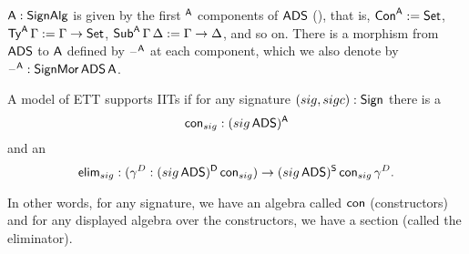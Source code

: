 \documentclass[a4paper,UKenglish,cleveref, autoref]{lipics-v2019}
\begin{document}
\begin{definition}\label{def:a}
  $\mathsf{A} : \mathsf{SignAlg}$ is given by the first $^{\mathsf{A}}$ components of $\mathsf{ADS}$
  (), that is, $\mathsf{Con}^{\mathsf{A}} := \mathsf{Set}$,
  $\mathsf{Ty}^{\mathsf{A}}\,\Gamma := \Gamma\rightarrow\mathsf{Set}$,
  $\mathsf{Sub}^{\mathsf{A}}\,\Gamma\,\Delta := \Gamma\rightarrow\Delta$, and so on. There is a
  morphism from $\mathsf{ADS}$ to $\mathsf{A}$ defined by $\mathord{\hspace{1pt}\text{--}\hspace{1pt}}^{\mathsf{A}}$ at each
  component, which we also denote by $\mathord{\hspace{1pt}\text{--}\hspace{1pt}}^{\mathsf{A}} : \mathsf{SignMor}\,\mathsf{ADS}\,\mathsf{A}$.
\end{definition}

\begin{definition}\label{sec:hasiits}
  A model of ETT supports IITs if for any signature $(sig,sigc):\mathsf{Sign}$
  there is a
  \[
    \mathsf{con}_{sig}: ({sig}\,\mathsf{ADS})^{\mathsf{A}}
  \]
  and an
  \[
    \mathsf{elim}_{sig} : (\gamma^D:({sig}\,\mathsf{ADS})^{\mathsf{D}}\,\mathsf{con}_{sig})\rightarrow ({sig}\,\mathsf{ADS})^{\mathsf{S}}\,\mathsf{con}_{sig}\,\gamma^D.
  \]
\end{definition}
In other words, for any signature, we have an algebra called $\mathsf{con}$
(constructors) and for any displayed algebra over the constructors, we
have a section (called the eliminator).
\end{document}
